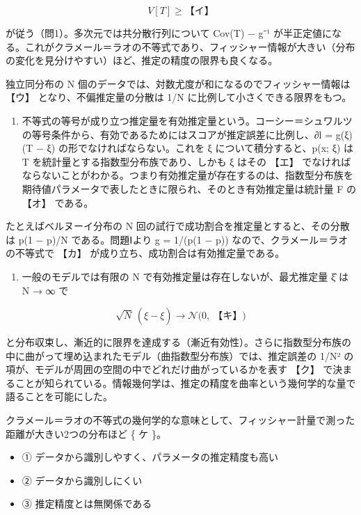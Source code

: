 \documentclass[
  10pt,
  a4paper,
]{article}
\providecommand{\tightlist}{%
  \setlength{\itemsep}{0pt}\setlength{\parskip}{0pt}}
\begin{document}
\[V[T] \ge \text{【イ】}\]

が従う（問1）。多次元では共分散行列について Cov(T) − g{\fallbackfont ⁻}¹
が半正定値になる。これがクラメール＝ラオの不等式であり、フィッシャー情報が大きい（分布の変化を見分けやすい）ほど、推定の精度の限界も良くなる。

独立同分布の N 個のデータでは、対数尤度が和になるのでフィッシャー情報は
【ウ】 となり、不偏推定量の分散は 1/N に比例して小さくできる限界をもつ。

\begin{enumerate}
\def\labelenumi{(\arabic{enumi})}
\setcounter{enumi}{1}
\tightlist
\item
  不等式の等号が成り立つ推定量を有効推定量という。コーシー＝シュワルツの等号条件から、有効であるためにはスコアが推定誤差に比例し、∂l
  = g(ξ)(T − ξ) の形でなければならない。これを ξ
  について積分すると、p(x; ξ) は T
  を統計量とする指数型分布族であり、しかも ξ はその 【エ】
  でなければならないことがわかる。つまり有効推定量が存在するのは、指数型分布族を期待値パラメータで表したときに限られ、そのとき有効推定量は統計量
  F の 【オ】 である。
\end{enumerate}

たとえばベルヌーイ分布の N
回の試行で成功割合を推定量とすると、その分散は p(1 − p)/N
である。問題Ⅰより g = 1/(p(1 − p)) なので、クラメール＝ラオの不等式で
【カ】 が成り立ち、成功割合は有効推定量である。

\begin{enumerate}
\def\labelenumi{(\arabic{enumi})}
\setcounter{enumi}{2}
\tightlist
\item
  一般のモデルでは有限の N で有効推定量は存在しないが、最尤推定量
  {\fallbackfont ξ̂} は N → ∞ で
\end{enumerate}

\[\sqrt{N}\, (\hat\xi - \xi) \longrightarrow \mathcal{N}\big(0,\ \text{【キ】}\big)\]

と分布収束し、漸近的に限界を達成する（漸近有効性）。さらに指数型分布族の中に曲がって埋め込まれたモデル（曲指数型分布族）では、推定誤差の
1/N² の項が、モデルが周囲の空間の中でどれだけ曲がっているかを表す 【ク】
で決まることが知られている。情報幾何学は、推定の精度を曲率という幾何学的な量で語ることを可能にした。

クラメール＝ラオの不等式の幾何学的な意味として、フィッシャー計量で測った距離が大きい2つの分布ほど
\{ ケ \}。

\begin{itemize}
\tightlist
\item
  ① データから識別しやすく、パラメータの推定精度も高い
\item
  ② データから識別しにくい
\item
  ③ 推定精度とは無関係である
\end{itemize}
\end{document}

